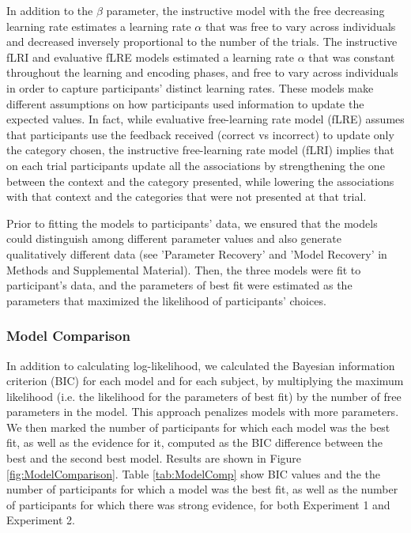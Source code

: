 \documentclass[a4paper,12pt]{article}
\begin{document}
In addition to the $\beta$ parameter, the instructive model with the free decreasing learning rate estimates a learning rate $\alpha$ that was free to vary across individuals and decreased inversely proportional to the number of the trials. The instructive fLRI and evaluative fLRE models estimated a learning rate $\alpha$ that was constant throughout the learning and encoding phases, and free to vary across individuals in order to capture participants' distinct learning rates. These models make different assumptions on how participants used information to update the expected values. In fact, while evaluative free-learning rate model (fLRE) assumes that participants use the feedback received (correct vs incorrect) to update only the category chosen, the instructive free-learning rate model (fLRI) implies that on each trial participants update all the associations by strengthening the one between the context and the category presented, while lowering the associations with that context and the categories that were not presented at that trial. \par
Prior to fitting the models to participants' data, we ensured that the models could distinguish among different parameter values and also generate qualitatively different data (see 'Parameter Recovery' and 'Model Recovery' in Methods and Supplemental Material). Then, the three models were fit to participant's data, and the parameters of best fit were estimated as the parameters that maximized the likelihood of participants' choices. 

\subsubsection{Model Comparison}
In addition to calculating log-likelihood, we calculated the Bayesian information criterion (BIC) for each model and for each subject, by multiplying the maximum likelihood (i.e. the likelihood for the parameters of best fit) by the number of free parameters in the model. This approach penalizes models with more parameters. We then marked the number of participants for which each model was the best fit, as well as the evidence for it, computed as the BIC difference between the best and the second best model. Results are shown in Figure \ref{fig:ModelComparison}. Table \ref{tab:ModelComp} show BIC values and the the number of participants for which a model was the best fit, as well as the number of participants for which there was strong evidence, for both Experiment 1 and Experiment 2. 
\end{document}
